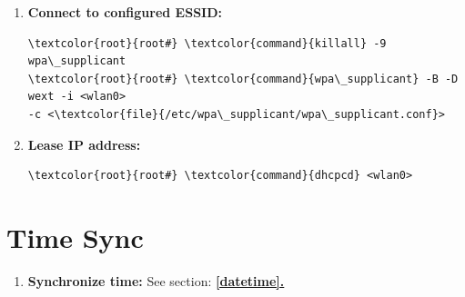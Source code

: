 \documentclass[10pt, a4paper, onecolumn, oneside, titlepage, openany]{book}
\begin{document}
\begin{enumerate}
\begin{Verbatim}[commandchars=\\\{\}]
\textcolor{comment}{## UNPROTECTED:}
network=\{
  ssid="<ESSID>"
  scan_ssid=1                 \textcolor{comment}{## Find hidden network}
  key_mgmt=NONE
  priority=3                  \textcolor{comment}{## Connection priority}
\}

\textcolor{comment}{## WPA-PSK:}
network=\{
  ssid="<ESSID>"
  scan_ssid=1                 \textcolor{comment}{## Find hidden network}
  key_mgmt=WPA-PSK
  psk="<PASSWORD>"
  #psk=<32byte-HEX-NUMBER>
  priority=1                  \textcolor{comment}{## Connection priority}
\}

\textcolor{comment}{## WPA-EAP:}
network=\{
  ssid="<ESSID>"
  scan_ssid=1                 \textcolor{comment}{## Find hidden network}
  key_mgmt=WPA-EAP
  #eap=PEAP
  identity="<EMAIL@ADDRESS>"
  password="<PASSWORD>"
  #psk=<32byte-HEX-NUMBER>
  #ca_cert="/etc/cert/ca.pem"
  #phase1="peaplabel=0"
  phase2="auth=MSCHAPV2"
  priority=2                  \textcolor{comment}{## Connection priority}
\}
\end{Verbatim}
    \item \textbf{Connect to configured ESSID:}
\begin{Verbatim}[commandchars=\\\{\}]
\textcolor{root}{root#} \textcolor{command}{killall} -9 wpa\_supplicant
\textcolor{root}{root#} \textcolor{command}{wpa\_supplicant} -B -D wext -i <wlan0>
-c <\textcolor{file}{/etc/wpa\_supplicant/wpa\_supplicant.conf}>
\end{Verbatim}
    \item \textbf{Lease IP address:}
\begin{Verbatim}[commandchars=\\\{\}]
\textcolor{root}{root#} \textcolor{command}{dhcpcd} <wlan0>
\end{Verbatim}
\end{enumerate}

\section{Time Sync}
\begin{enumerate}
    \item \textbf{Synchronize time:}
\newline See section: \underline{\textbf{\ref{datetime}.}}
\end{enumerate}
\end{document}
